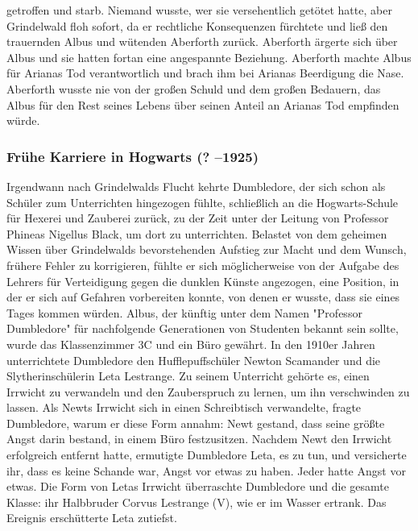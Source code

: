 \documentclass[a4paper, 10pt]{article}
\begin{document}
getroffen und starb. Niemand wusste, wer sie versehentlich getötet hatte, aber Grindelwald floh sofort, da er rechtliche Konsequenzen fürchtete und ließ den trauernden Albus und wütenden Aberforth zurück. Aberforth ärgerte sich über Albus und sie hatten fortan eine angespannte Beziehung. Aberforth machte Albus für Arianas Tod verantwortlich und brach ihm bei Arianas Beerdigung die Nase. Aberforth wusste nie von der großen Schuld und dem großen Bedauern, das Albus für den Rest seines Lebens über seinen Anteil an Arianas Tod empfinden würde.


\subsubsection*{\large Frühe Karriere in Hogwarts (? –1925)}
Irgendwann nach Grindelwalds Flucht kehrte Dumbledore, der sich schon als Schüler zum Unterrichten hingezogen fühlte, schließlich an die Hogwarts-Schule für Hexerei und Zauberei zurück, zu der Zeit unter der Leitung von Professor Phineas Nigellus Black, um dort zu unterrichten. Belastet von dem geheimen Wissen über Grindelwalds bevorstehenden Aufstieg zur Macht und dem Wunsch, frühere Fehler zu korrigieren, fühlte er sich möglicherweise von der Aufgabe des Lehrers für Verteidigung gegen die dunklen Künste angezogen, eine Position, in der er sich auf Gefahren vorbereiten konnte, von denen er wusste, dass sie eines Tages kommen würden. Albus, der künftig unter dem Namen "Professor Dumbledore" für nachfolgende Generationen von Studenten bekannt sein sollte, wurde das Klassenzimmer 3C und ein Büro gewährt.
\vspace{10pt}
\newline
{}  
In den 1910er Jahren unterrichtete Dumbledore den Hufflepuffschüler Newton Scamander und die Slytherinschülerin Leta Lestrange. Zu seinem Unterricht gehörte es, einen Irrwicht zu verwandeln und den Zauberspruch zu lernen, um ihn verschwinden zu lassen. Als Newts Irrwicht sich in einen Schreibtisch verwandelte, fragte Dumbledore, warum er diese Form annahm: Newt gestand, dass seine größte Angst darin bestand, in einem Büro festzusitzen. Nachdem Newt den Irrwicht erfolgreich entfernt hatte, ermutigte Dumbledore Leta, es zu tun, und versicherte ihr, dass es keine Schande war, Angst vor etwas zu haben. Jeder hatte Angst vor etwas. Die Form von Letas Irrwicht überraschte Dumbledore und die gesamte Klasse: ihr Halbbruder Corvus Lestrange (V), wie er im Wasser ertrank. Das Ereignis erschütterte Leta zutiefst.
\vspace{10pt}
\end{document}
